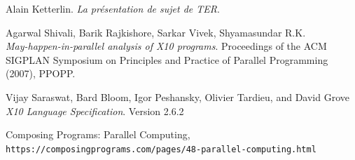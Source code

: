 \documentclass[12pt]{scrartcl}
\begin{document}
\newpage

\begin{thebibliography}{9}
  Alain Ketterlin.
  \textit{La présentation de sujet de TER}. 
   
  Agarwal Shivali, Barik Rajkishore, Sarkar Vivek, Shyamasundar R.K.\\
  \textit{May-happen-in-parallel analysis of X10 programs}.
  Proceedings of the ACM SIGPLAN Symposium on Principles and Practice of Parallel Programming (2007), PPOPP.
   
  Vijay Saraswat, Bard Bloom, Igor Peshansky, Olivier Tardieu, and David Grove
  \textit{X10 Language Specification}. 
  Version 2.6.2

  Composing Programs: Parallel Computing,
  \\\texttt{https://composingprograms.com/pages/48-parallel-computing.html}
  \end{thebibliography}
 
\end{document}
